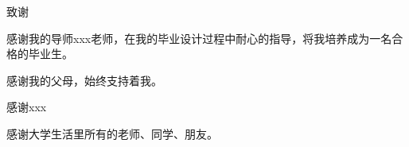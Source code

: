 \newpage
{} %
\begin{center}
	{\fontsize{14}{21}致\quad 谢}
\end{center}

感谢我的导师xxx老师，在我的毕业设计过程中耐心的指导，将我培养成为一名合格的毕业生。

感谢我的父母，始终支持着我。

感谢xxx

感谢大学生活里所有的老师、同学、朋友。